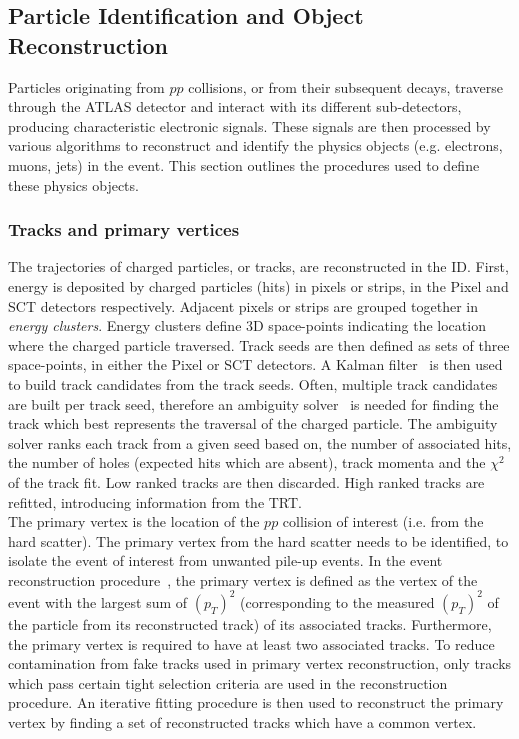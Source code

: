 \subsection{Particle Identification and Object Reconstruction}


Particles originating from $pp$ collisions, or from their subsequent decays, traverse through the ATLAS detector and interact with its different sub-detectors, producing characteristic electronic signals. These signals are then processed by various algorithms to reconstruct and identify the physics objects (e.g. electrons, muons, jets) in the event. This section outlines the procedures used to define these physics objects.

\subsubsection{Tracks and primary vertices}

The trajectories of charged particles, or tracks, are reconstructed in the ID. First, energy is deposited by charged particles (hits) in pixels or strips, in the Pixel and SCT detectors respectively. Adjacent pixels or strips are grouped together in \textit{energy clusters}. Energy clusters define 3D space-points indicating the location where the charged particle traversed. Track seeds are then defined as sets of three space-points, in either the Pixel or SCT detectors. A Kalman filter~\cite{ASTIER2000138} is then used to build track candidates from the track seeds. Often, multiple track candidates are built per track seed, therefore an ambiguity solver~\cite{Choi:2018mie} is needed for finding the track which best represents the traversal of the charged particle. The ambiguity solver ranks each track from a given seed based on, the number of associated hits, the number of holes (expected hits which are absent), track momenta and the $\chi^{2}$ of the track fit. Low ranked tracks are then discarded. High ranked tracks are refitted, introducing information from the TRT.\\

The primary vertex is the location of the $pp$ collision of interest (i.e. from the hard scatter). The primary vertex from the hard scatter needs to be identified, to isolate the event of interest from unwanted pile-up events. In the event reconstruction procedure~\cite{Meloni_2016}, the primary vertex is defined as the vertex of the event with the largest sum of $(p_{T})^{2}$ (corresponding to the measured $(p_{T})^{2}$ of the particle from its reconstructed track) of its associated tracks. Furthermore, the primary vertex is required to have at least two associated tracks. To reduce contamination from fake tracks used in primary vertex reconstruction, only tracks which pass certain tight selection criteria are used in the reconstruction procedure. An iterative fitting procedure is then used to reconstruct the primary vertex by finding a set of reconstructed tracks which have a common vertex.


